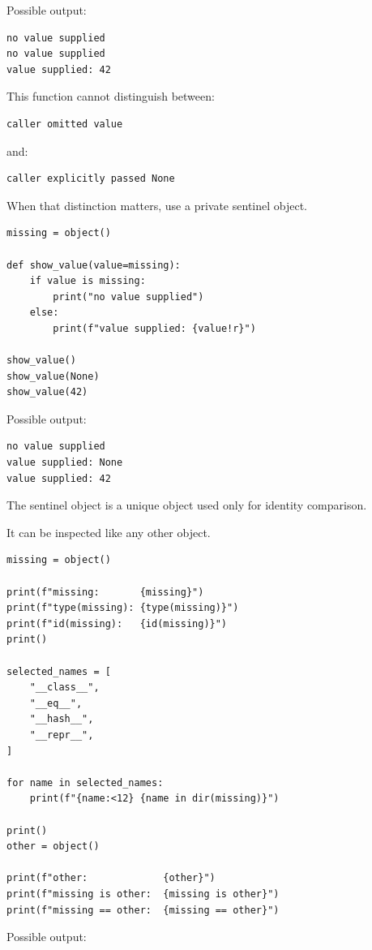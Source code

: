 Possible output:

\begin{verbatim}
no value supplied
no value supplied
value supplied: 42
\end{verbatim}

This function cannot distinguish between:

\begin{verbatim}
caller omitted value
\end{verbatim}

and:

\begin{verbatim}
caller explicitly passed None
\end{verbatim}

When that distinction matters, use a private sentinel object.

\begin{verbatim}
missing = object()

def show_value(value=missing):
    if value is missing:
        print("no value supplied")
    else:
        print(f"value supplied: {value!r}")

show_value()
show_value(None)
show_value(42)
\end{verbatim}

Possible output:

\begin{verbatim}
no value supplied
value supplied: None
value supplied: 42
\end{verbatim}

The sentinel object is a unique object used only for identity comparison.

It can be inspected like any other object.

\begin{verbatim}
missing = object()

print(f"missing:       {missing}")
print(f"type(missing): {type(missing)}")
print(f"id(missing):   {id(missing)}")
print()

selected_names = [
    "__class__",
    "__eq__",
    "__hash__",
    "__repr__",
]

for name in selected_names:
    print(f"{name:<12} {name in dir(missing)}")

print()
other = object()

print(f"other:             {other}")
print(f"missing is other:  {missing is other}")
print(f"missing == other:  {missing == other}")
\end{verbatim}

Possible output:

